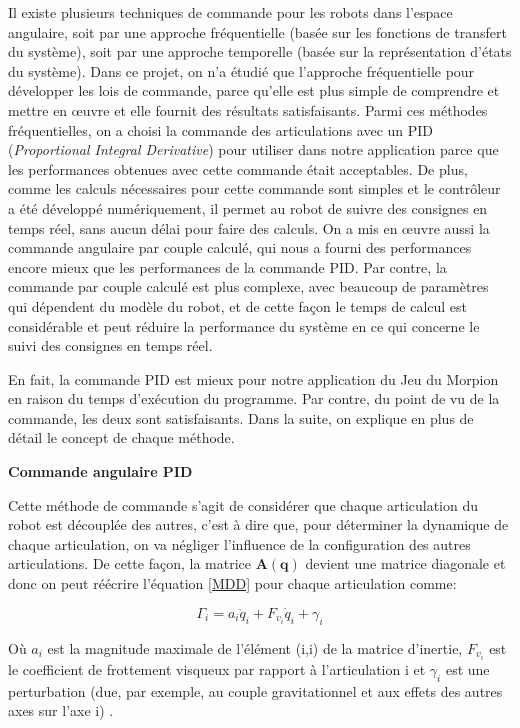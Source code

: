 Il existe plusieurs techniques de commande pour les robots dans l'espace angulaire, soit par une approche fréquentielle (basée sur les fonctions de transfert du système), soit par une approche temporelle (basée sur la représentation d'états du système). Dans ce projet, on n'a étudié que l'approche fréquentielle pour développer les lois de commande, parce qu'elle est plus simple de comprendre et mettre en \oe{}uvre et elle fournit des résultats satisfaisants. Parmi ces méthodes fréquentielles, on a choisi la commande des articulations avec un PID (\textit{Proportional Integral Derivative}) pour utiliser dans notre application parce que les performances obtenues avec cette commande était acceptables. De plus, comme les calculs nécessaires pour cette commande sont simples et le contrôleur a été développé numériquement, il permet au robot de suivre des consignes en temps réel, sans aucun délai pour faire des calculs. On a mis en \oe{}uvre aussi la commande angulaire par couple calculé, qui nous a fourni des performances encore mieux que les performances de la commande PID. Par contre, la commande par couple calculé est plus complexe, avec beaucoup de paramètres qui dépendent du modèle du robot, et de cette façon le temps de calcul est considérable et peut réduire la performance du système en ce qui concerne le suivi des consignes en temps réel.

En fait, la commande PID est mieux pour notre application du Jeu du Morpion en raison du temps d'exécution du programme. Par contre, du point de vu de la commande, les deux sont satisfaisants. Dans la suite, on explique en plus de détail le concept de chaque méthode.
\newline

\textbf{Commande angulaire PID}
\newline

Cette méthode de commande s'agit de considérer que chaque articulation du robot est découplée des autres, c'est à dire que, pour déterminer la dynamique de chaque articulation, on va négliger l'influence de la configuration des autres articulations. De cette façon, la matrice $ \bm{A}(\bm{q}) $ devient une matrice diagonale et donc on peut réécrire l'équation \ref{MDD} pour chaque articulation comme:

\begin{equation} \label{dyn_PID}
	\Gamma_i = a_i\ddot{q}_i+F_{v_i}\dot{q}_i+\gamma_i
\end{equation}

Où $ a_i $ est la magnitude maximale de l'élément (i,i)  de la matrice d'inertie, $ F_{v_i} $ est le coefficient de frottement visqueux par rapport à l'articulation i et $ \gamma_i $ est une perturbation (due, par exemple, au couple gravitationnel et aux effets des autres axes sur l'axe i) \cite{khalil2004modeling}.

